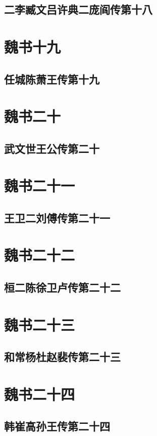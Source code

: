 \documentclass[12pt,UTF8]{ctexbook}
\begin{document}
\chapter{二李臧文吕许典二庞阎传第十八}

\part{魏书十九}
\chapter{任城陈萧王传第十九}

\part{魏书二十}
\chapter{武文世王公传第二十}

\part{魏书二十一}
\chapter{王卫二刘傅传第二十一}

\part{魏书二十二}
\chapter{桓二陈徐卫卢传第二十二}

\part{魏书二十三}
\chapter{和常杨杜赵裴传第二十三}

\part{魏书二十四}
\chapter{韩崔高孙王传第二十四}
\end{document}
